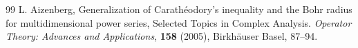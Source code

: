 \documentclass[a4paper,12pt]{amsart}
\theoremstyle{definition}
\begin{document}
\begin{thebibliography}{99}
	 {\sc L. Aizenberg}, Generalization of Carath\'{e}odory’s inequality and the Bohr radius for multidimensional power series, Selected Topics in Complex Analysis. \textit{Operator Theory: Advances and Applications}, {\bf 158} (2005), Birkhäuser Basel, 87--94.
	
	
	
	
	
	
	
	
	
	
	
	
	

\end{thebibliography}
\end{document}
